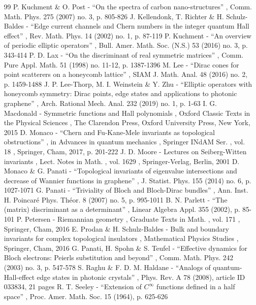 \documentclass[11pt]{article}
\numberwithin{equation}{section}
\begin{document}
\begin{thebibliography}{99}
 P. Kuchment \& O. Post - “On the spectra of carbon nano-structures” , Comm. Math. Phys. 275 (2007) no. 3, p. 805-826
 J. Kellendonk, T. Richter \& H. Schulz-Baldes - “Edge current channels and Chern numbers in the integer quantum Hall effect” , Rev. Math. Phys. 14 (2002) no. 1, p. 87-119
 P. Kuchment - “An overview of periodic elliptic operators” , Bull. Amer. Math. Soc. (N.S.) 53 (2016) no. 3, p. 343-414
 P. D. Lax - “On the discriminant of real symmetric matrices” , Comm. Pure Appl. Math. 51 (1998) no. 11-12, p. 1387-1396
 M. Lee - “Dirac cones for point scatterers on a honeycomb lattice” , SIAM J. Math. Anal. 48 (2016) no. 2, p. 1459-1488
 J. P. Lee-Thorp, M. I. Weinstein \& Y. Zhu - “Elliptic operators with honeycomb symmetry: Dirac points, edge states and applications to photonic graphene” , Arch. Rational Mech. Anal. 232 (2019) no. 1, p. 1-63
 I. G. Macdonald - Symmetric functions and Hall polynomials , Oxford Classic Texts in the Physical Sciences , The Clarendon Press, Oxford University Press, New York, 2015
 D. Monaco - “Chern and Fu-Kane-Mele invariants as topological obstructions” , in Advances in quantum mechanics , Springer INdAM Ser. , vol. 18 , Springer, Cham, 2017, p. 201-222
 J. D. Moore - Lectures on Seiberg-Witten invariants , Lect. Notes in Math. , vol. 1629 , Springer-Verlag, Berlin, 2001
 D. Monaco \& G. Panati - “Topological invariants of eigenvalue intersections and decrease of Wannier functions in graphene” , J. Statist. Phys. 155 (2014) no. 6, p. 1027-1071
 G. Panati - “Triviality of Bloch and Bloch-Dirac bundles” , Ann. Inst. H. Poincaré Phys. Théor. 8 (2007) no. 5, p. 995-1011
 B. N. Parlett - “The (matrix) discriminant as a determinant” , Linear Algebra Appl. 355 (2002), p. 85-101
 P. Petersen - Riemannian geometry , Graduate Texts in Math. , vol. 171 , Springer, Cham, 2016
 E. Prodan \& H. Schulz-Baldes - Bulk and boundary invariants for complex topological insulators , Mathematical Physics Studies , Springer, Cham, 2016
 G. Panati, H. Spohn \& S. Teufel - “Effective dynamics for Bloch electrons: Peierls substitution and beyond” , Comm. Math. Phys. 242 (2003) no. 3, p. 547-578
 S. Raghu \& F. D. M. Haldane - “Analogs of quantum-Hall-effect edge states in photonic crystals” , Phys. Rev. A 78 (2008), article ID 033834, 21 pages
 R. T. Seeley - “Extension of $C^{\infty }$ functions defined in a half space” , Proc. Amer. Math. Soc. 15 (1964), p. 625-626

\end{thebibliography}
\end{document}

